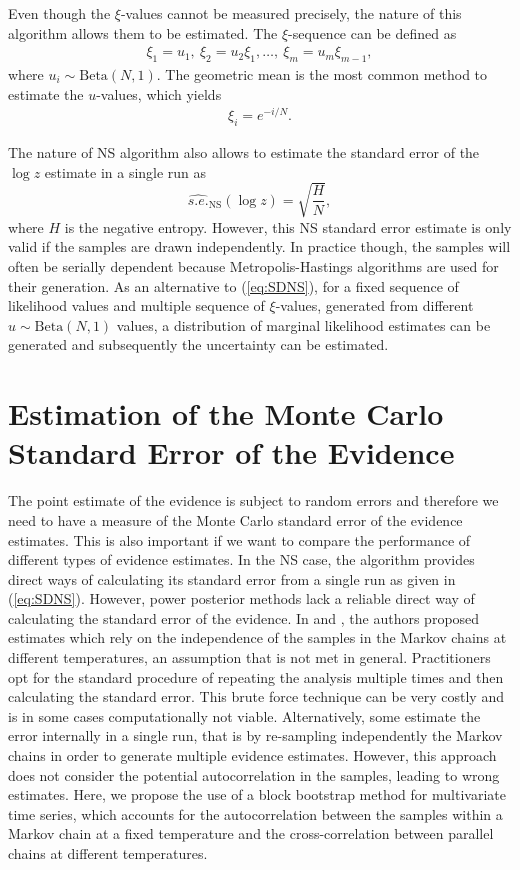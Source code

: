 \documentclass[aps,reprint,amsmath,amssymb,showpacs,showkeys]{revtex4-1}%
\begin{document}
Even though the $\xi$-values cannot be measured precisely, the nature of this algorithm allows them to be estimated. 
The $\xi$-sequence can be defined as 
\begin{align*}
\xi_1 = u_1,\: \xi_2 = u_2 \xi_1, \dots,\: \xi_m = u_m \xi_{m-1},
\end{align*}
where $u_i\sim\text{Beta}(N,1)$.  The geometric mean is the most common method to estimate the $u$-values, which yields
\begin{align*}
\xi_i = e^{-i/N}.
\end{align*}

The nature of NS algorithm also allows to estimate the standard error of the $\log z$ estimate in a single run as 
\begin{equation}\label{eq:SDNS}
\widehat{s.e.}_{\text{NS}}(\log z) = \sqrt{\dfrac{H}{N}},
\end{equation}
where $H$ is the negative entropy.  However, this NS standard error estimate is only valid if the samples are drawn independently. In practice though, the samples will often be serially dependent because Metropolis-Hastings algorithms are  used for their generation. As an alternative to (\ref{eq:SDNS}), for a fixed sequence of likelihood values and multiple sequence of $\xi$-values, generated from different  $u\!\sim\!\text{Beta}(N,1)$ values, a distribution of marginal likelihood estimates can be generated and subsequently the uncertainty can be estimated. 
\bigskip


\section{Estimation of the Monte Carlo Standard Error of the Evidence}
The point estimate of the evidence is subject to random errors and therefore we need 
 to have a measure of the Monte Carlo standard error of the evidence estimates.  This is also important if we want to compare the  performance of different types of evidence estimates.  In the NS case, the algorithm provides direct ways of calculating its standard error from  a single run as given in (\ref{eq:SDNS}).  However, power posterior methods lack a reliable direct way of calculating the standard error of the evidence.  In \cite{Lartillot:Philippe:2006} and \cite{Xie:Lewis:Fan:Kuo:Chen:2011}, the authors proposed estimates which rely on the  independence of the samples in the Markov chains at different temperatures, an assumption that is not met  in general.  Practitioners opt for the standard procedure of repeating the analysis multiple times and then calculating the standard error.  This brute force technique can be very costly and is in some cases computationally not viable.  Alternatively, some estimate the error internally in a single run, that is by re-sampling independently the Markov chains in order to generate multiple evidence estimates.  However, this approach does not consider the potential autocorrelation in the samples, leading to wrong estimates.  Here, we propose the use of a block bootstrap method for multivariate time series, which accounts for  the autocorrelation between the samples within a Markov chain at a fixed
temperature and the cross-correlation between parallel chains at different temperatures.
	
\end{document}
